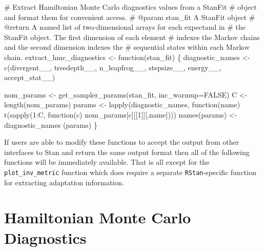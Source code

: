 \documentclass[
  letterpaper,
  DIV=11,
  numbers=noendperiod]{scrartcl}
\newenvironment{Shaded}{\begin{snugshade}}{\end{snugshade}}
\newcommand{\CommentTok}[1]{\textcolor[rgb]{0.37,0.37,0.37}{#1}}
\newcommand{\DecValTok}[1]{\textcolor[rgb]{0.68,0.00,0.00}{#1}}
\newcommand{\NormalTok}[1]{\textcolor[rgb]{0.00,0.23,0.31}{#1}}
\newcommand{\OperatorTok}[1]{\textcolor[rgb]{0.37,0.37,0.37}{#1}}
\newcommand{\StringTok}[1]{\textcolor[rgb]{0.13,0.47,0.30}{#1}}
\begin{document}
\begin{Shaded}
\begin{Highlighting}[]
\CommentTok{\# Extract Hamiltonian Monte Carlo diagnostics values from a StanFit}
\CommentTok{\# object and format them for convenient access.}
\CommentTok{\# @param stan\_fit A StanFit object}
\CommentTok{\# @return A named list of two{-}dimensional arrays for each expectand in }
\CommentTok{\#         the StanFit object.  The first dimension of each element }
\CommentTok{\#         indexes the Markov chains and the second dimension indexes the }
\CommentTok{\#         sequential states within each Markov chain. }
\NormalTok{extract\_hmc\_diagnostics }\OperatorTok{\textless{}{-}}\NormalTok{ function(stan\_fit) \{}
\NormalTok{  diagnostic\_names }\OperatorTok{\textless{}{-}}\NormalTok{ c(}\StringTok{\textquotesingle{}divergent\_\_\textquotesingle{}}\NormalTok{, }\StringTok{\textquotesingle{}treedepth\_\_\textquotesingle{}}\NormalTok{, }\StringTok{\textquotesingle{}n\_leapfrog\_\_\textquotesingle{}}\NormalTok{, }
                        \StringTok{\textquotesingle{}stepsize\_\_\textquotesingle{}}\NormalTok{, }\StringTok{\textquotesingle{}energy\_\_\textquotesingle{}}\NormalTok{, }\StringTok{\textquotesingle{}accept\_stat\_\_\textquotesingle{}}\NormalTok{)}

\NormalTok{  nom\_params }\OperatorTok{\textless{}{-}}\NormalTok{ get\_sampler\_params(stan\_fit, inc\_warmup}\OperatorTok{=}\NormalTok{FALSE)}
\NormalTok{  C }\OperatorTok{\textless{}{-}}\NormalTok{ length(nom\_params)}
\NormalTok{  params }\OperatorTok{\textless{}{-}}\NormalTok{ lapply(diagnostic\_names, }
\NormalTok{                   function(name) t(sapply(}\DecValTok{1}\NormalTok{:C, function(c) }
\NormalTok{                                  nom\_params[c][[}\DecValTok{1}\NormalTok{]][,name])))}
\NormalTok{  names(params) }\OperatorTok{\textless{}{-}}\NormalTok{ diagnostic\_names}
\NormalTok{  (params)}
\NormalTok{\}}
\end{Highlighting}
\end{Shaded}

If users are able to modify these functions to accept the output from
other interfaces to Stan and return the same output format then all of
the following functions will be immediately available. That is all
except for the \texttt{plot\_inv\_metric} function which does require a
separate \texttt{RStan}-specific function for extracting adaptation
information.

\hypertarget{hamiltonian-monte-carlo-diagnostics}{%
\section{Hamiltonian Monte Carlo
Diagnostics}\label{hamiltonian-monte-carlo-diagnostics}}
\end{document}
